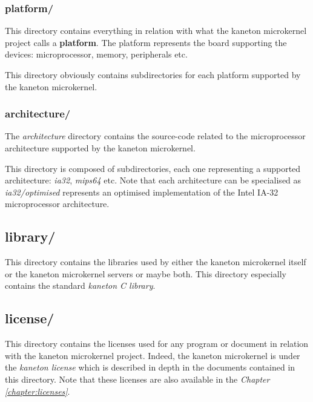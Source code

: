 
\subsubsection*{platform/}

This directory contains everything in relation with what the kaneton
microkernel project calls a \textbf{platform}. The platform represents the
board supporting the devices: microprocessor, memory, peripherals etc.

This directory obviously contains subdirectories for each platform
supported by the kaneton microkernel.


\subsubsection*{architecture/}

The \textit{architecture} directory contains the source-code related to
the microprocessor architecture supported by the kaneton microkernel.

This directory is composed of subdirectories, each one representing a
supported architecture: \textit{ia32}, \textit{mips64} etc. Note that each
architecture can be specialised as \textit{ia32/optimised} represents an
optimised implementation of the Intel IA-32 microprocessor architecture.

%
%

\subsection*{library/}

This directory contains the libraries used by either the kaneton microkernel
itself or the kaneton microkernel servers or maybe both. This directory
especially contains the standard \textit{kaneton C library}.

%
%

\subsection*{license/}

This directory contains the licenses used for any program or document
in relation with the kaneton microkernel project. Indeed, the kaneton
microkernel is under the \textit{kaneton license} which is described in
depth in the documents contained in this directory. Note that these licenses
are also available in the \textit{Chapter \ref{chapter:licenses}}.

